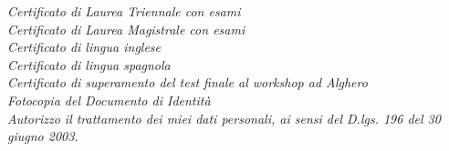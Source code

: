 \documentclass[a4paper,12pt]{article} %
\begin{document}













\Sep %


\textit{Certificato di Laurea Triennale con esami}\\
\textit{Certificato di Laurea Magistrale con esami}\\
\textit{Certificato di lingua inglese}\\
\textit{Certificato di lingua spagnola}\\
\textit{Certificato di superamento del test finale al workshop ad Alghero}\\
\textit{Fotocopia del Documento di Identit\`a}\\

\bigskip
\textit{Autorizzo il trattamento dei miei dati personali, ai sensi del D.lgs. 196 del 30 giugno 2003.}\\
\end{document}
